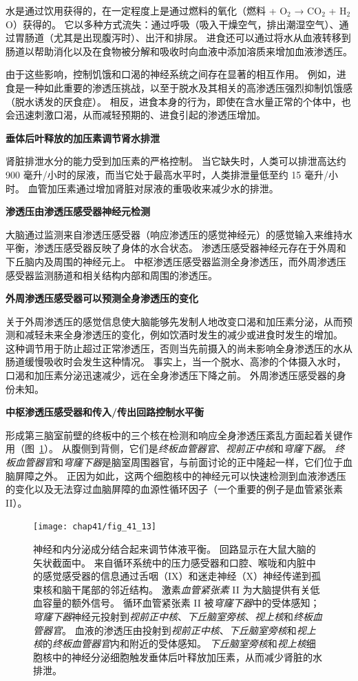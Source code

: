 水是通过饮用获得的，在一定程度上是通过燃料的氧化（燃料 + O$_2$ → CO$_2$ + H$_2$O）获得的。
它以多种方式流失：通过呼吸（吸入干燥空气，排出潮湿空气）、通过胃肠道（尤其是出现腹泻时）、出汗和排尿。
进食还可以通过将水从血液转移到肠道以帮助消化以及在食物被分解和吸收时向血液中添加溶质来增加血液渗透压。


由于这些影响，控制饥饿和口渴的神经系统之间存在显著的相互作用。
例如，进食是一种如此重要的渗透压挑战，以至于脱水及其相关的高渗透压强烈抑制饥饿感（脱水诱发的厌食症）。
相反，进食本身的行为，即使在含水量正常的个体中，也会迅速刺激口渴，从而减轻预期的、进食引起的渗透压增加。


\textbf{垂体后叶释放的加压素调节肾水排泄}

肾脏排泄水分的能力受到加压素的严格控制。
当它缺失时，人类可以排泄高达约 900 毫升/小时的尿液，而当它处于最高水平时，人类排泄量低至约 15 毫升/小时。
血管加压素通过增加肾脏对尿液的重吸收来减少水的排泄。


\textbf{渗透压由渗透压感受器神经元检测}

大脑通过监测来自渗透压感受器（响应渗透压的感觉神经元）的感觉输入来维持水平衡，渗透压感受器反映了身体的水合状态。
渗透压感受器神经元存在于外周和下丘脑内及周围的神经元上。
中枢渗透压感受器监测全身渗透压，而外周渗透压感受器监测肠道和相关结构内部和周围的渗透压。


\textbf{外周渗透压感受器可以预测全身渗透压的变化}

关于外周渗透压的感觉信息使大脑能够先发制人地改变口渴和加压素分泌，从而预测和减轻未来全身渗透压的变化，例如饮酒时发生的减少或进食时发生的增加。
这种调节用于防止超过正常渗透压，否则当先前摄入的尚未影响全身渗透压的水从肠道缓慢吸收时会发生这种情况。
事实上，当一个脱水、高渗的个体摄入水时，口渴和加压素分泌迅速减少，远在全身渗透压下降之前。
外周渗透压感受器的身份未知。


\textbf{中枢渗透压感受器和传入/传出回路控制水平衡}

形成第三脑室前壁的终板中的三个核在检测和响应全身渗透压紊乱方面起着关键作用（图~\ref{fig:41_13}）。
从腹侧到背侧，它们是\textit{终板血管器官}、\textit{视前正中核}和\textit{穹窿下器}。
\textit{终板血管器官}和\textit{穹窿下器}是脑室周围器官，与前面讨论的正中隆起一样，它们位于血脑屏障之外。
正因为如此，这两个细胞核中的神经元可以快速检测到血液渗透压的变化以及无法穿过血脑屏障的血源性循环因子（一个重要的例子是血管紧张素 II）。


\begin{figure}[htbp]
	\centering
	\texttt{[image: chap41/fig\_41\_13]}
	\caption{神经和内分泌成分结合起来调节体液平衡。
		回路显示在大鼠大脑的矢状截面中。
		来自循环系统中的压力感受器和口腔、喉咙和内脏中的感觉感受器的信息通过舌咽（IX）和迷走神经（X）神经传递到孤束核和脑干尾部的邻近结构。
		激素\textit{血管紧张素} II 为大脑提供有关低血容量的额外信号。
		循环血管紧张素 II 被\textit{穹窿下器}中的受体感知； 
		\textit{穹窿下器}神经元投射到\textit{视前正中核}、\textit{下丘脑室旁核}、\textit{视上核}和\textit{终板血管器官}。
		血液的渗透压由投射到\textit{视前正中核}、\textit{下丘脑室旁核}和\textit{视上核}的\textit{终板血管器官}内和附近的受体感知。
		\textit{下丘脑室旁核}和\textit{视上核}细胞核中的神经分泌细胞触发垂体后叶释放加压素，从而减少肾脏的水排泄\cite{swanson2000cerebral}。}
	\label{fig:41_13}
\end{figure}


